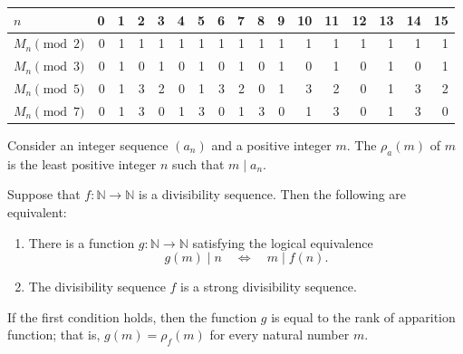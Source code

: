 \begin{example}
\begin{enumerate}
\begin{center}
      \renewcommand{\arraystretch}{1.25}
      \begin{tabular}{l|@{\hspace{2\tabcolsep}}*{16}{C}}
        $n$             & 0 & 1 & 2 & 3 & 4 & 5 & 6 & 7 & 8 & 9 & 10 & 11 & 12 & 13 & 14 & 15 \\ \midrule
        $M_n\pmod{2}$ & 0 & 1 & 1 & 1 & 1 & 1 & 1 & 1 & 1 & 1 & 1 & 1 & 1 & 1 & 1 & 1 \\
        $M_n\pmod{3}$ & 0 & 1 & 0 & 1 & 0 & 1 & 0 & 1 & 0 & 1 & 0 & 1 & 0 & 1 & 0 & 1 \\
        $M_n\pmod{5}$ & 0 & 1 & 3 & 2 & 0 & 1 & 3 & 2 & 0 & 1 & 3 & 2 & 0 & 1 & 3 & 2 \\
        $M_n\pmod{7}$ & 0 & 1 & 3 & 0 & 1 & 3 & 0 & 1 & 3 & 0 & 1 & 3 & 0 & 1 & 3 & 0
      \end{tabular}
    \end{center}
  \end{enumerate}
\end{example}

\begin{definition}
  Consider an integer sequence $(a_n)$ and a positive integer $m$. The  $\rho_a(m)$ of $m$ is the least positive integer $n$ such that $m\mid a_n$.
\end{definition}

\begin{theorem}\label{theorem:rank-of-apparition}
  Suppose that $f:\mathbb{N}\to\mathbb{N}$ is a divisibility sequence. Then the following are equivalent:
  \begin{enumerate}
  \item There is a function $g:\mathbb{N}\to\mathbb{N}$ satisfying the logical equivalence
  \begin{equation*}
    g(m)\mid n \quad\Leftrightarrow\quad m\mid f(n).
  \end{equation*}
  \item The divisibility sequence $f$ is a strong divisibility sequence.
  \end{enumerate}
  If the first condition holds, then the function $g$ is equal to the rank of apparition function; that is, $g(m)=\rho_f(m)$ for every natural number $m$.
\end{theorem}

